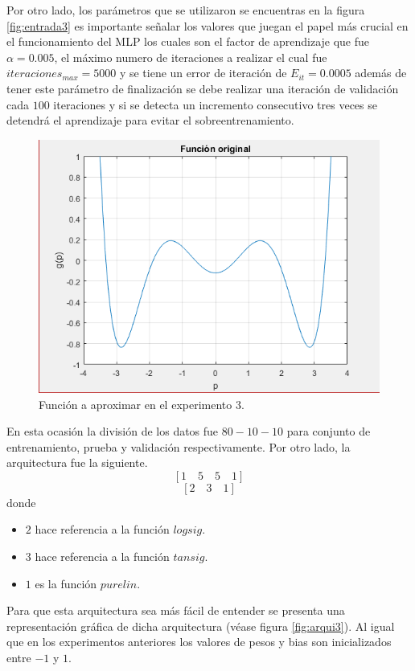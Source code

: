 Por otro lado, los parámetros que se utilizaron se encuentras en la figura \ref{fig:entrada3} es importante señalar los valores que juegan el papel más crucial en el funcionamiento del MLP los cuales son el factor de aprendizaje que fue$\alpha=0.005$, el máximo numero de iteraciones a realizar el cual fue $iteraciones_{max} = 5000$ y se tiene un error de iteración de $E_{it} = 0.0005$ además de tener este parámetro de finalización se debe realizar una iteración de validación cada $100$ iteraciones y si se detecta un incremento consecutivo tres veces se detendrá el aprendizaje para evitar el sobreentrenamiento.
\begin{figure}[H]
    \begin{center}
        \includegraphics[width=12cm]{3/original.png}
        \caption{Función a aproximar en el experimento 3.}
        \label{fig:original3}
    \end{center}
\end{figure}
En esta ocasión la división de los datos fue $80-10-10$ para conjunto de entrenamiento, prueba y validación respectivamente. Por otro lado, la arquitectura fue la siguiente.
\[ \left[ 1 \quad 5 \quad 5 \quad 1 \right] \]
\[ \left[ 2 \quad 3 \quad 1 \right] \]
donde
\begin{itemize}
    \item $2$ hace referencia a la función $logsig$.
    \item $3$ hace referencia a la función $tansig$.
    \item $1$ es la función $purelin$.
\end{itemize}
Para que esta arquitectura sea más fácil de entender se presenta una representación gráfica de dicha arquitectura (véase figura \ref{fig:arqui3}). Al igual que en los experimentos anteriores los valores de pesos y bias son inicializados entre $-1$ y $1$.
